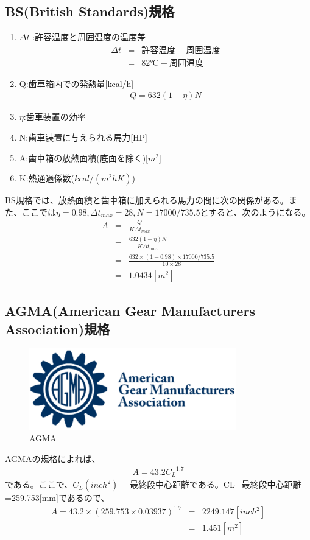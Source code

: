 \documentclass[a4j,twoside,openright,11pt]{jreport}
\begin{document}
\subsection{BS(British Standards)規格}
\begin{enumerate}
\item $\Delta t$ :許容温度と周囲温度の温度差
\begin{eqnarray}
\Delta t &=&  許容温度 - 周囲温度\\
         &=&  82℃ - 周囲温度
\end{eqnarray}
\item Q:歯車箱内での発熱量[kcal/h]
\begin{eqnarray}
Q=632(1-\eta)N
\end{eqnarray}
\item $\eta$:歯車装置の効率
\item N:歯車装置に与えられる馬力[HP]
\item A:歯車箱の放熱面積(底面を除く)[$m^2$]
\item K:熱通過係数($kcal/(m^2hK)$)
\end{enumerate}
BS規格では、放熱面積と歯車箱に加えられる馬力の間に次の関係がある。また、ここでは$\eta=0.98,\Delta t_{max} = 28,N=17000/735.5$とすると、次のようになる。
\begin{eqnarray}
A&=&\frac{Q}{K\Delta t_{max}}\\
 &=&\frac{632(1-\eta)N}{K\Delta t_{max}}\\
 &=&\frac{632\times(1-0.98) \times 17000/735.5}{10 \times 28}\\
 &=&1.0434[m^2]
\end{eqnarray}
\subsection{AGMA(American Gear Manufacturers Association)規格}
\begin{figure}[htbp]
  \begin{center}
\includegraphics[width=9cm]{20127161210319005.eps}
\end{center}
\caption{AGMA}
\end{figure}
AGMAの規格によれば、
\begin{eqnarray}
A=43.2{C_L}^{1.7}
\end{eqnarray}
である。ここで、$C_L(inch^2)=最終段中心距離$である。CL=最終段中心距離=259.753[mm]であるので、
\begin{eqnarray}
A=43.2 \times (259.753 \times 0.03937)^{1.7} &=& 2249.147 [inch^2]\\
&=&1.451[m^2]
\end{eqnarray}
\end{document}
